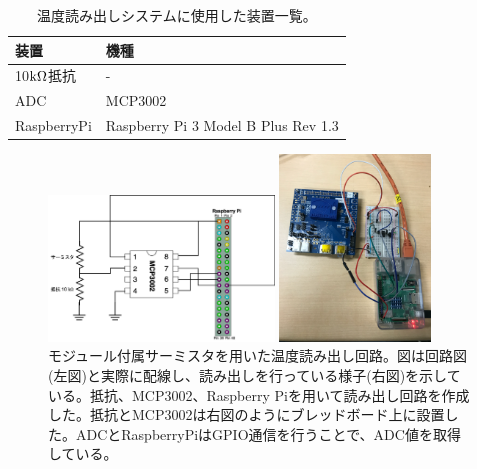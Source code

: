 \begin{table}[tbp]
\begin{center}
\caption[温度読み出しシステムに使用した装置一覧]{温度読み出しシステムに使用した装置一覧。}
\label{demo_temp_device}
  \small
  \begin{tabular}{|ll|} \hline
    装置 & 機種 \\ \hline
    10$\rm{k\Omega}$抵抗 & - \\
    ADC & MCP3002\cite{5-3} \\  
    RaspberryPi &  Raspberry Pi 3 Model B Plus Rev 1.3\cite{5-4} \\ \hline 
  \end{tabular}
\end{center}
\end{table}

\begin{figure}[h]\centering
  \begin{minipage}{0.5\hsize}
    \includegraphics[width=6cm]{./temp_circit.png}
  \end{minipage}
  \begin{minipage}{0.4\hsize}
    \includegraphics[width=4cm]{./temp_circit_pic.png}
  \end{minipage}
\caption[モジュール付属サーミスタを用いた温度読み出し回路]{モジュール付属サーミスタを用いた温度読み出し回路。図は回路図(左図)と実際に配線し、読み出しを行っている様子(右図)を示している。抵抗、MCP3002、Raspberry Piを用いて読み出し回路を作成した。抵抗とMCP3002は右図のようにブレッドボード上に設置した。ADCとRaspberryPiはGPIO通信\cite{5-9}を行うことで、ADC値を取得している。}
\label{demo_temp_circit_pic}
\end{figure}

